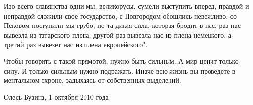 Изо всего славянства одни мы, великорусы, сумели выступить вперед, правдой и
неправдой сложили свое государство, с Новгородом обошлись невежливо, со Псковом
поступили мы грубо, но та дикая сила, которая бродит в нас, раз нас вывезла из
татарского плена, другой раз вывезла нас из плена немецкого, а третий раз
вывезет нас из плена европейского".

Чтобы говорить с такой прямотой, нужно быть сильным. А мир ценит только силу. И
только сильным нужно подражать. Иначе всю жизнь вы проведете в ментальном
схроне, задыхаясь от собственных выделений.

Олесь Бузина, 1 октября 2010 года
